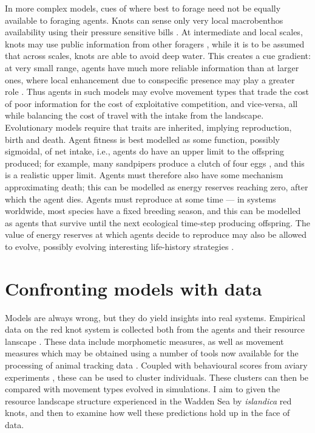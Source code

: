 In more complex models, cues of where best to forage need not be equally available to foraging agents. Knots can sense only very local macrobenthos availability using their pressure sensitive bills \citep{piersma1998}. At intermediate and local scales, knots may use public information from other foragers \citep{bijleveld2015b}, while it is to be assumed that across scales, knots are able to avoid deep water. This creates a cue gradient: at very small range, agents have much more reliable information than at larger ones, where local enhancement due to conspecific presence may play a greater role \citep{beauchamp2013}. Thus agents in such models may evolve movement types that trade the cost of poor information for the cost of exploitative competition, and vice-versa, all while balancing the cost of travel with the intake from the landscape. Evolutionary models require that traits are inherited, implying reproduction, birth and death. Agent fitness is best modelled as some function, possibly sigmoidal, of net intake, i.e., agents do have an upper limit to the offspring produced; for example, many sandpipers produce a clutch of four eggs \citep{piersma2019}, and this is a realistic upper limit. Agents must therefore also have some mechanism approximating death; this can be modelled as energy reserves reaching zero, after which the agent dies. Agents must reproduce at some time --- in systems worldwide, most species have a fixed breeding season, and this can be modelled as agents that survive until the next ecological time-step producing offspring. The value of energy reserves at which agents decide to reproduce may also be allowed to evolve, possibly evolving interesting life-history strategies \citep[as in][]{wolf2012, wolf2007a}.

\section{Confronting models with data}

Models are always wrong, but they do yield insights into real systems. Empirical data on the red knot system is collected both from the agents \citetext{\citealp[ in \citet{bijleveld2015b}]{maccurdy2015}; \citealp[examples in][]{bijleveld2016}; \citealp{oudman2018}} and their resource lanscape \citep{bijleveld2012}. These data include morphometic measures, as well as movement measures which may be obtained using a number of tools now available for the processing of animal tracking data \citep[most recent review by][]{joo2019}. Coupled with behavioural scores from aviary experiments \citep[currently ongoing at NIOZ; see e.g.][]{bijleveld2012a, bijleveld2015b}, these can be used to cluster individuals. These clusters can then be compared with movement types evolved in simulations. I aim to given the resource landscape structure experienced in the Wadden Sea by \emph{islandica} red knots, and then to examine how well these predictions hold up in the face of data.

